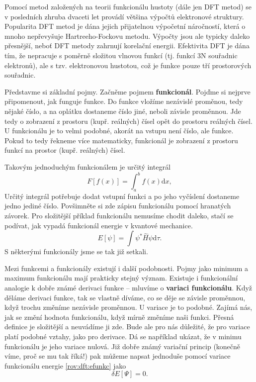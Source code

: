 Pomocí metod založených na teorii funkcionálu hustoty (dále jen DFT metod) se v posledních zhruba dvaceti let provádí většina výpočtů elektronové struktury. Popularita DFT metod je dána jejich přijatelnou výpočetní náročností, která o mnoho nepřevyšuje Hartreeho-Fockovu 
metodu. Výpočty jsou ale typicky daleko přesnější, neboť DFT metody zahrnují korelační energii. Efektivita DFT je dána tím, že nepracuje s poměrně složitou vlnovou funkcí (tj. funkcí 3N souřadnic elektronů), ale s tzv. elektronovou hustotou, což je funkce pouze tří prostorových souřadnic. 

Představme si základní pojmy. Začněme pojmem \textbf{funkcionál}. Pojďme si nejprve připomenout, jak funguje funkce. Do funkce vložíme nezávislé proměnou, tedy nějaké číslo, a na oplátku dostaneme číslo jiné, neboli závisle proměnnou. Jde tedy o zobrazení z prostoru  (kupř. reálných) čísel opět do prostoru reálných čísel. U funkcionálu je to velmi podobné, akorát na vstupu není číslo, ale funkce. Pokud to tedy řekneme více matematicky, funkcionál je zobrazení z prostoru funkcí na prostor (kupř. reálných) čísel.

Takovým jednoduchým funkcionálem je určitý integrál
$$
F[f(x)] = \int_a^b f(x) \mathrm{d}x, 
$$
Určitý integrál potřebuje dodat vstupní funkci a po jeho vyčíslení dostaneme jedno jediné číslo. Povšimněte si zde zápisu funkcionálu pomocí hranatých závorek.  
Pro složitější příklad funkcionálu nemusíme chodit daleko, stačí se podívat, jak vypadá funkcionál energie v kvantové mechanice.
$$
E[\psi] = \int \psi^*\hat{H}\psi \mathrm{d}\tau .
\label{rov:dft:efunkc}
$$
S některými funkcionály jsme se tak již setkali.

Mezi funkcemi a funkcionály existují i další podobnosti. Pojmy jako minimum a maximum funkcionálu mají prakticky stejný význam. Existuje i funkcionální analogie k dobře známé derivaci funkce -- mluvíme o \textbf{variaci funkcionálu}.
Když děláme derivaci funkce, tak se vlastně díváme, co se děje se závisle proměnnou, když trochu změníme nezávisle proměnnou.
U variace je to podobné. Zajímá nás, jak se změní hodnota funkcionálu, když mírně změníme naši funkci. Přesná definice je složitější a neuvádíme ji zde. Bude ale pro nás důležité, že pro variace platí podobné vztahy, jako pro derivace. Dá se například ukázat, že v minimu funkcionálu je jeho variace nulová. Již dobře známý variační princip (konečně víme, proč se mu tak říká!) pak můžeme napsat jednoduše pomocí variace funkcionálu energie \eqref{rov:dft:efunkc} jako
$$
\delta E[\Psi] = 0 .
$$

